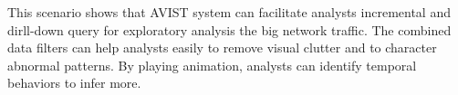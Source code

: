\documentclass[journal]{vgtc}                %
\begin{document}
{%




This scenario shows that AVIST system can facilitate analysts incremental and dirll-down query for exploratory analysis the big network traffic. The combined data filters can help analysts easily to remove visual clutter and to character abnormal patterns. By playing animation, analysts can identify temporal behaviors to infer more. 
 

 



}
\end{document}
